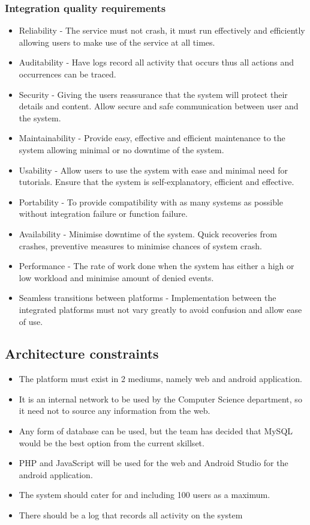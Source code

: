 \documentclass[11pt]{article}
\begin{document}
	\subsubsection{Integration quality requirements}
	\begin{itemize}
		\item Reliability - The service must not crash, it must run effectively and efficiently allowing users to make use of the service at all times.
		\item Auditability - Have logs record all activity that occurs thus all actions and occurrences can be traced.
		\item Security - Giving the users reassurance that the system will protect their details and content. Allow secure and safe communication between user and the system.
		\item Maintainability - Provide easy, effective and efficient maintenance to the system allowing minimal or no downtime of the system.
		\item Usability - Allow users to use the system with ease and minimal need for tutorials. Ensure that the system is self-explanatory, efficient and effective.
		\item Portability - To provide compatibility with as many systems as possible without integration failure or function failure.
		\item Availability - Minimise downtime of the system. Quick recoveries from crashes, preventive measures to minimise chances of system crash.
		\item Performance - The rate of work done when the system has either a high or low workload and minimise amount of denied events.
		\item Seamless transitions between platforms - Implementation between the integrated platforms must not vary greatly to avoid confusion and allow ease of use.
	\end{itemize}
	
	\subsection{Architecture constraints}
	
	\begin{itemize}
		\item The platform must exist in 2 mediums, namely web and android application.
		\item It is an internal network to be used by the Computer Science department, so it need not to source any information from the web.
		\item Any form of database can be used, but the team has decided that MySQL would be the best option from the current skillset.
		\item PHP and JavaScript will be used for the web and Android Studio for the android application.
		\item The system should cater for and including 100 users as a maximum.
		\item There should be a log that records all activity on the system
	\end{itemize}
	
\end{document}
